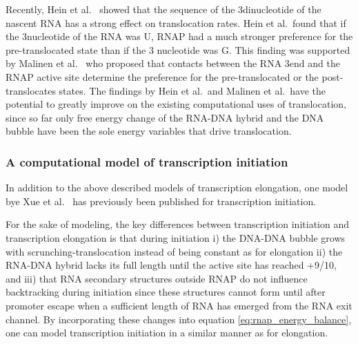 Recently, Hein et al.\ \cite{hein_rna_2011} showed that the sequence of the
3\ppp dinucleotide of the nascent RNA has a strong effect on translocation
rates.  Hein et al.\ found that if the 3\ppp nucleotide of the RNA was U, RNAP
had a much stronger preference for the pre-translocated state than if the 3\ppp
nucleotide was G. This finding was supported by Malinen et al.\
\cite{malinen_active_2012} who proposed that contacts between the RNA 3\ppp end
and the RNAP active site determine the preference for the pre-translocated or
the post-translocates states. The findings by Hein et al.\ and Malinen et al.\
have the potential to greatly improve on the existing computational uses of
translocation, since so far only free energy change of the RNA-DNA hybrid
and the DNA bubble have been the sole energy variables that drive translocation.

\subsubsection{A computational model of transcription initiation}
In addition to the above described models of transcription elongation, one
model bye Xue et al.\ \cite{xue_kinetic_2008} has previously been published for
transcription initiation.

For the sake of modeling, the key differences between transcription initiation
and transcription elongation is that during initiation i) the DNA-DNA
bubble grows with scrunching-translocation instead of being constant as for
elongation ii) the RNA-DNA hybrid lacks its full length until
the active site has reached +9/10, and iii) that RNA secondary structures
outside RNAP do not influence backtracking during initiation since these
structures cannot form until after promoter escape when a sufficient length of
RNA has emerged from the RNA exit channel. By incorporating these changes into
equation \eqref{eq:rnap_energy_balance}, one can model transcription initiation
in a similar manner as for elongation.

